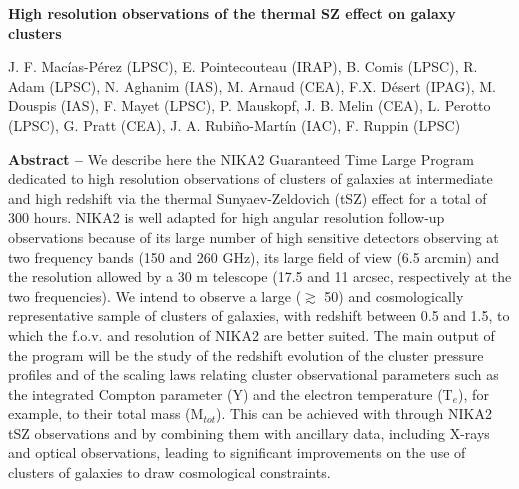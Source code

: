 \documentclass[11pt,a4paper,twoside,graphicx,color]{article}
\begin{document}
%
%
\begin{center}{\huge \bf
High resolution observations of the thermal SZ effect on galaxy clusters
}\end{center}
% 
\begin{center}
J. F. Mac\'ias-P\'erez (LPSC), E. Pointecouteau (IRAP), B. Comis (LPSC), R. Adam (LPSC), N. Aghanim (IAS), M. Arnaud (CEA), F.X. D\'esert (IPAG), M. Douspis (IAS), F. Mayet (LPSC), P. Mauskopf, J. B. Melin (CEA), L. Perotto (LPSC), G. Pratt (CEA), J. A. Rubi\~no-Mart\'in (IAC), F. Ruppin (LPSC)
\end{center}

\vspace{-0.3cm}
{\bf Abstract -- } 
We describe here the NIKA2 Guaranteed Time Large Program dedicated to high resolution observations of clusters of galaxies at intermediate and high redshift via the thermal Sunyaev-Zeldovich (tSZ) effect for a total of 300 hours. NIKA2 is well adapted for high angular resolution follow-up observations because of its large number of high sensitive detectors observing at two frequency bands (150 and 260 GHz), its large field of view (6.5 arcmin) and the resolution allowed by a 30 m telescope (17.5 and 11 arcsec, respectively at the two frequencies). We intend to observe a large ($\gtrsim$ 50) and cosmologically representative sample of clusters of galaxies, with redshift between 0.5 and 1.5, to which the f.o.v. and resolution of NIKA2 are better suited. The main output of the program will be the study of the redshift evolution of the cluster pressure profiles and of the scaling laws relating cluster observational parameters such as the integrated Compton parameter (Y) and the electron temperature (T$_e$), for example, to their total mass (M$_{tot}$). This can be achieved with through NIKA2 tSZ observations and by combining them with ancillary data, including X-rays and optical observations, leading to significant improvements on the use of clusters of galaxies to draw cosmological constraints.\\
\end{document}
